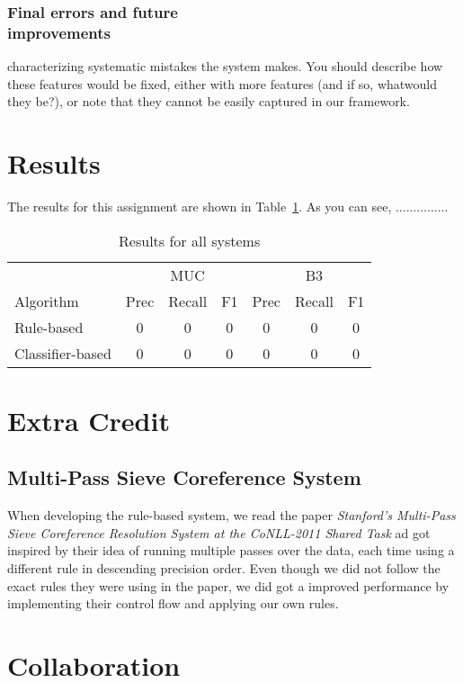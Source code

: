 \documentclass[12pt, twocolumn]{article}
\begin{document}
\subsubsection{Final errors and future\\ improvements}
characterizing systematic mistakes the system makes. You should describe how these features
would be fixed, either with more features (and if so, whatwould they be?), or note that they cannot be easily captured
in our framework.
\section{Results}
The results for this assignment are shown in Table~\ref{tab:results}. As you can see, ...............
\begin{table}[b]
\begin{minipage}{\textwidth}
\centering
\begin{tabular}{l|c c c|c c c}
\hline
& & MUC & & & B3 & \\
Algorithm & Prec & Recall & F1 & Prec & Recall & F1 \\\hline
Rule-based & 0 & 0 & 0 & 0 & 0 & 0\\\hline  
Classifier-based & 0 & 0 & 0 & 0 & 0 & 0\\\hline
\end{tabular}
\caption{Results for all systems}\label{tab:results}
\end{minipage}
\end{table}


\section{Extra Credit}
\subsection{Multi-Pass Sieve Coreference System}
When developing the rule-based system, we read the paper 
\textit{Stanford’s Multi-Pass Sieve Coreference Resolution System at the CoNLL-2011 Shared Task} ad got inspired by their idea of running multiple passes over the data, each time using a different rule in descending precision order. Even though we did not follow the exact rules they were using in the paper, we did got a improved performance by implementing their control flow and applying our own rules.


\section{Collaboration} 
\end{document}
